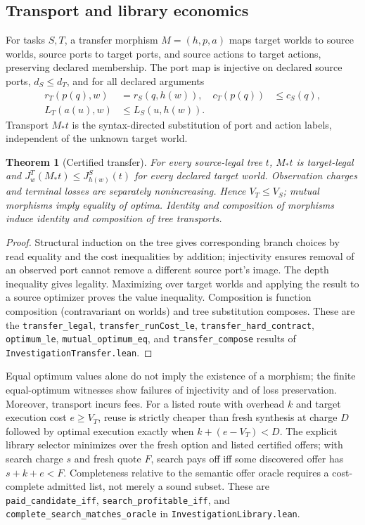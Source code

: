 \documentclass[10pt,letterpaper]{article}
\newtheorem{theorem}{Theorem}[section]
\newcommand{\rc}[1]{\texttt{#1}}
\begin{document}
\subsection{Transport and library economics}
For tasks $S,T$, a transfer morphism $M=(h,p,a)$ maps target worlds to source worlds, source ports to target ports, and source actions to target actions, preserving declared membership. The port map is injective on declared source ports, $d_S\le d_T$, and for all declared arguments
\begin{align*}
 r_T(p(q),w)&=r_S(q,h(w)), & c_T(p(q))&\le c_S(q),\\
 L_T(a(u),w)&\le L_S(u,h(w)).
\end{align*}
Transport $M_*t$ is the syntax-directed substitution of port and action labels, independent of the unknown target world.
\begin{theorem}[Certified transfer]\label{thm:transfer}
For every source-legal tree $t$, $M_*t$ is target-legal and $J^T_w(M_*t)\le J^S_{h(w)}(t)$ for every declared target world. Observation charges and terminal losses are separately nonincreasing. Hence $V_T\le V_S$; mutual morphisms imply equality of optima. Identity and composition of morphisms induce identity and composition of tree transports.
\end{theorem}
\begin{proof}
Structural induction on the tree gives corresponding branch choices by read equality and the cost inequalities by addition; injectivity ensures removal of an observed port cannot remove a different source port's image. The depth inequality gives legality. Maximizing over target worlds and applying the result to a source optimizer proves the value inequality. Composition is function composition (contravariant on worlds) and tree substitution composes. These are the \rc{transfer\_legal}, \rc{transfer\_runCost\_le}, \rc{transfer\_hard\_contract}, \rc{optimum\_le}, \rc{mutual\_optimum\_eq}, and \rc{transfer\_compose} results of \rc{InvestigationTransfer.lean}.
\end{proof}
Equal optimum values alone do not imply the existence of a morphism; the finite equal-optimum witnesses show failures of injectivity and of loss preservation. Moreover, transport incurs fees. For a listed route with overhead $k$ and target execution cost $e\ge V_T$, reuse is strictly cheaper than fresh synthesis at charge $D$ followed by optimal execution exactly when $k+(e-V_T)<D$. The explicit library selector minimizes over the fresh option and listed certified offers; with search charge $s$ and fresh quote $F$, search pays off iff some discovered offer has $s+k+e<F$. Completeness relative to the semantic offer oracle requires a cost-complete admitted list, not merely a sound subset. These are \rc{paid\_candidate\_iff}, \rc{search\_profitable\_iff}, and \rc{complete\_search\_matches\_oracle} in \rc{InvestigationLibrary.lean}.
\end{document}

